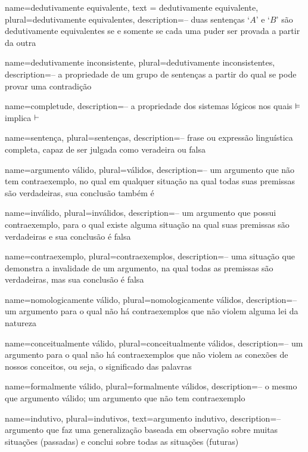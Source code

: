   {
    name=dedutivamente equivalente,
    text = dedutivamente equivalente,
    plural=dedutivamente equivalentes,
  description={-- duas sentenças `$A$' e `$B$' são  dedutivamente equivalentes  se e somente se cada  uma puder ser provada a partir da outra}
  }
  
  {    name={dedutivamente inconsistente}, 
       plural={dedutivamente inconsistentes},
    description={-- a propriedade de um grupo de sentenças a partir do qual se pode provar uma contradição}
  }
  
  {
  name=completude,
  description={-- a propriedade dos sistemas lógicos nos quais $\vDash $ implica $\vdash$}
  }
  
  {
  name=sentença,
  plural=sentenças,
  description={-- frase ou expressão linguística completa, capaz de ser julgada como veradeira ou falsa}
  }
  
  {
  name=argumento válido,
  plural=válidos,
  description={-- um argumento que não tem contraexemplo, no qual em qualquer situação na qual todas suas premissas são verdadeiras, sua conclusão também é}
  }
  
  {
  name=inválido,
  plural=inválidos,
  description={-- um argumento que possui contraexemplo, para o qual existe alguma situação na qual suas premissas são verdadeiras e sua conclusão é falsa}
  }
  
  {
  name=contraexemplo,
  plural=contraexemplos,
  description={-- uma situação que demonstra a invalidade de um argumento, na qual todas as premissas são verdadeiras, mas sua conclusão é falsa}
  }
  
  {
  name=nomologicamente válido,
  plural=nomologicamente válidos,
  description={-- um argumento para o qual não há contraexemplos que não violem alguma lei da natureza}
  }
  
  {
  name=conceitualmente válido,
  plural=conceitualmente válidos,
  description={-- um argumento para o qual não há contraexemplos que não violem as conexões de nossos conceitos, ou seja, o significado das palavras}
  }
  
  {
  name=formalmente válido,
  plural=formalmente válidos,
  description={-- o mesmo que argumento válido; um argumento que não tem contraexemplo}
  }
  
  {
  name=indutivo,
  plural=indutivos,
  text=argumento indutivo,
  description={-- argumento que faz uma generalização baseada em observação sobre muitas situações (passadas) e conclui sobre todas as situações (futuras)}
  }
  